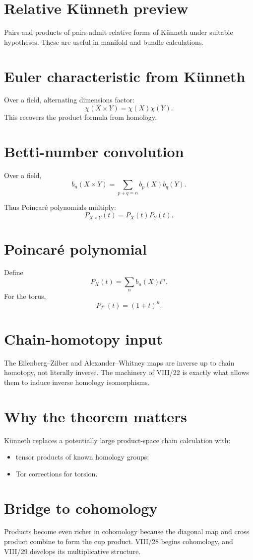 \section{Relative Künneth preview}
Pairs and products of pairs admit relative forms of Künneth under suitable
hypotheses.  These are useful in manifold and bundle calculations.

\section{Euler characteristic from Künneth}
Over a field, alternating dimensions factor:
\[
\chi(X\times Y)
=
\chi(X)\chi(Y).
\]
This recovers the product formula from homology.

\section{Betti-number convolution}
Over a field,
\[
b_n(X\times Y)
=
\sum_{p+q=n}b_p(X)b_q(Y).
\]

Thus Poincaré polynomials multiply:
\[
P_{X\times Y}(t)=P_X(t)P_Y(t).
\]

\section{Poincaré polynomial}
Define
\[
P_X(t)=\sum_n b_n(X)t^n.
\]
For the torus,
\[
P_{T^n}(t)=(1+t)^n.
\]

\section{Chain-homotopy input}
The Eilenberg--Zilber and Alexander--Whitney maps are inverse up to chain
homotopy, not literally inverse.  The machinery of VIII/22 is exactly what
allows them to induce inverse homology isomorphisms.

\section{Why the theorem matters}
Künneth replaces a potentially large product-space chain calculation with:
\begin{itemize}
\item tensor products of known homology groups;
\item Tor corrections for torsion.
\end{itemize}

\section{Bridge to cohomology}
Products become even richer in cohomology because the diagonal map and cross
product combine to form the cup product.  VIII/28 begins cohomology, and
VIII/29 develops its multiplicative structure.


